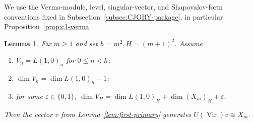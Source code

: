 \documentclass[10pt,a4paper]{amsart}
\numberwithin{equation}{section} \newtheorem{thm}{Theorem}[section] \newtheorem{lem}[thm]{Lemma} \newtheorem{ex}[thm]{Example} \newtheorem{prop}[thm]{Proposition} \newtheorem{cor}[thm]{Corollary} \newtheorem{defi}[thm]{Definition} \newtheorem{rmk}[thm]{Remark} \newtheorem{notation}[thm]{Notation}
\newcommand{\Vir}{\operatorname{Vir}}
\begin{document}
We use the Verma-module, level, singular-vector, and Shapovalov-form conventions fixed in Subsection~\ref{subsec:CJORY-package}, in particular Proposition~\ref{prop:c1-verma}.

\begin{lem}\label{lem:first-singular}
Fix $m\ge1$ and set \(h=m^2,H=(m+1)^2.\) Assume
\begin{enumerate}[label=(\roman*),leftmargin=2.1em]
\item $V_n=L(1,0)_n$ for $0\le n<h$;
\item $\dim V_h=\dim L(1,0)_h+1$;
\item for some $\varepsilon\in\{0,1\}$, \(\dim V_H=\dim L(1,0)_H+\dim(X_m)_H+\varepsilon.\)
\end{enumerate}
Then the vector $v$ from Lemma~\ref{lem:first-primary} generates \(U(\Vir)v\cong X_m.\)
\end{lem}
\end{document}

